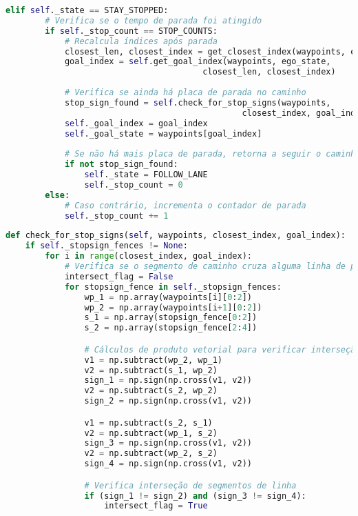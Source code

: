 \documentclass[
	12pt,				%
	oneside, %
	a4paper,			%
	english,			%
	french,				%
	spanish,			%
	brazil				%
	]{abntex2}
\begin{document}
\begin{apendicesenv}
\begin{lstlisting}[language=Python, caption=Implementação parcial da função de transição de estados., label=lst:transition_state_implementation]
    elif self._state == STAY_STOPPED:
        # Verifica se o tempo de parada foi atingido
        if self._stop_count == STOP_COUNTS:
            # Recalcula índices após parada
            closest_len, closest_index = get_closest_index(waypoints, ego_state)
            goal_index = self.get_goal_index(waypoints, ego_state,
                                        closest_len, closest_index)
            
            # Verifica se ainda há placa de parada no caminho
            stop_sign_found = self.check_for_stop_signs(waypoints,
                                                closest_index, goal_index)[1]
            self._goal_index = goal_index
            self._goal_state = waypoints[goal_index]
            
            # Se não há mais placa de parada, retorna a seguir o caminho
            if not stop_sign_found:
                self._state = FOLLOW_LANE
                self._stop_count = 0
        else:
            # Caso contrário, incrementa o contador de parada
            self._stop_count += 1
\end{lstlisting}

\begin{lstlisting}[language=Python, caption=Implementação parcial da verificação de interseção com cercas virtuais., label=lst:check_stop_signs_implementation]
def check_for_stop_signs(self, waypoints, closest_index, goal_index):
    if self._stopsign_fences != None:
        for i in range(closest_index, goal_index):
            # Verifica se o segmento de caminho cruza alguma linha de parada
            intersect_flag = False
            for stopsign_fence in self._stopsign_fences:
                wp_1 = np.array(waypoints[i][0:2])
                wp_2 = np.array(waypoints[i+1][0:2])
                s_1 = np.array(stopsign_fence[0:2])
                s_2 = np.array(stopsign_fence[2:4])

                # Cálculos de produto vetorial para verificar interseção
                v1 = np.subtract(wp_2, wp_1)
                v2 = np.subtract(s_1, wp_2)
                sign_1 = np.sign(np.cross(v1, v2))
                v2 = np.subtract(s_2, wp_2)
                sign_2 = np.sign(np.cross(v1, v2))

                v1 = np.subtract(s_2, s_1)
                v2 = np.subtract(wp_1, s_2)
                sign_3 = np.sign(np.cross(v1, v2))
                v2 = np.subtract(wp_2, s_2)
                sign_4 = np.sign(np.cross(v1, v2))

                # Verifica interseção de segmentos de linha
                if (sign_1 != sign_2) and (sign_3 != sign_4):
                    intersect_flag = True
                

\end{lstlisting}
\end{apendicesenv}
\end{document}
